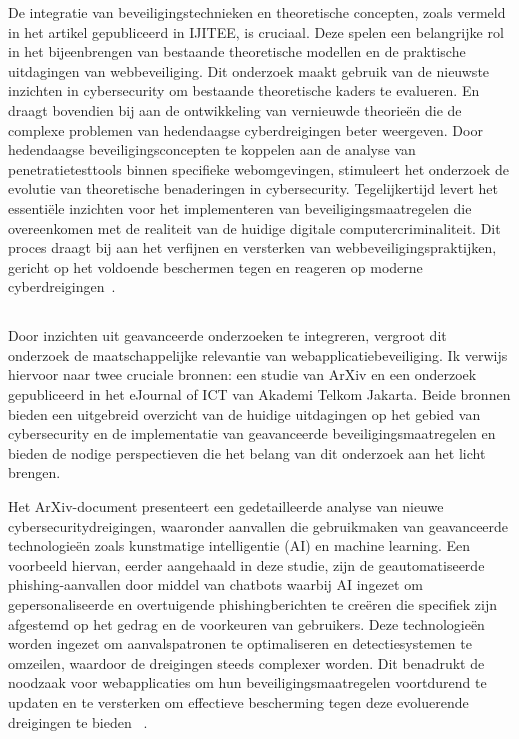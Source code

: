 De integratie van beveiligingstechnieken en theoretische concepten, zoals vermeld in het artikel gepubliceerd in IJITEE, is cruciaal. Deze spelen een belangrijke rol 
in het bijeenbrengen van bestaande theoretische modellen en de praktische uitdagingen van webbeveiliging. Dit onderzoek maakt gebruik van de nieuwste inzichten in cybersecurity 
om bestaande theoretische kaders te evalueren. En draagt bovendien bij aan de ontwikkeling van vernieuwde theorieën die de complexe problemen van hedendaagse 
cyberdreigingen beter weergeven. Door hedendaagse beveiligingsconcepten te koppelen aan de analyse van penetratietesttools binnen specifieke webomgevingen, 
stimuleert het onderzoek de evolutie van theoretische benaderingen in cybersecurity. Tegelijkertijd levert het essentiële inzichten voor het implementeren van beveiligingsmaatregelen
die overeenkomen met de realiteit van de huidige digitale computercriminaliteit.
Dit proces draagt bij aan het verfijnen en versterken van webbeveiligingspraktijken, gericht op het voldoende beschermen tegen en reageren op moderne 
cyberdreigingen~\autocite{Nagendran2019}.

\subsection{}
Door inzichten uit geavanceerde onderzoeken te integreren, vergroot dit onderzoek de maatschappelijke relevantie van webapplicatiebeveiliging. Ik verwijs hiervoor naar 
twee cruciale bronnen: een studie van ArXiv en een onderzoek gepubliceerd in het eJournal of ICT van Akademi Telkom Jakarta. Beide bronnen bieden een uitgebreid overzicht 
van de huidige uitdagingen op het gebied van cybersecurity en de implementatie van geavanceerde beveiligingsmaatregelen en bieden de nodige perspectieven die het 
belang van dit onderzoek aan het licht brengen.

Het ArXiv-document presenteert een gedetailleerde analyse van nieuwe cybersecuritydreigingen, waaronder aanvallen die gebruikmaken van geavanceerde technologieën zoals 
kunstmatige intelligentie (AI) en machine learning. Een voorbeeld hiervan, eerder aangehaald in deze studie, zijn de geautomatiseerde phishing-aanvallen door middel van chatbots waarbij AI ingezet om 
gepersonaliseerde en overtuigende phishingberichten te creëren die specifiek zijn afgestemd op het gedrag en de voorkeuren van gebruikers. Deze technologieën worden ingezet om 
aanvalspatronen te optimaliseren en detectiesystemen te omzeilen, waardoor de dreigingen steeds complexer worden. Dit benadrukt de noodzaak voor webapplicaties om hun 
beveiligingsmaatregelen voortdurend te updaten en te versterken om effectieve bescherming tegen deze evoluerende dreigingen te bieden ~\autocite{Deng2023}.

